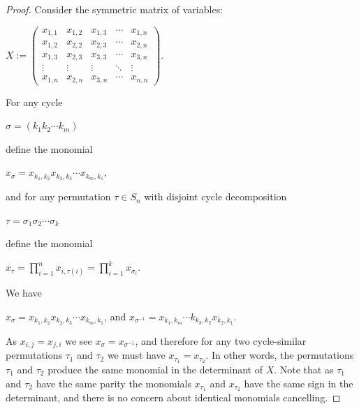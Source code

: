 \documentclass{article}
\begin{document}
\begin{proof}
  Consider the symmetric matrix of variables:
  \begin{center}
    $X := \left(\begin{array}{ccccc} x_{1,1} & x_{1,2} & x_{1,3} & \cdots & x_{1,n} \\ x_{1,2} & x_{2,2} & x_{2,3} & \cdots & x_{2,n} \\ x_{1,3} & x_{2,3} & x_{3,3} & \cdots & x_{3,n} \\ \vdots & \vdots & \vdots & \ddots & \vdots \\ x_{1,n} & x_{2,n} & x_{3,n} & \cdots & x_{n,n} \end{array}\right)$.
  \end{center} 
  For any cycle
  \begin{center}
    $\sigma = (k_{1}k_{2} \cdots k_{m})$
  \end{center}
  define the monomial
  \begin{center}
    $x_{\sigma} = x_{k_{1},k_{2}}x_{k_{2},k_{3}} \cdots x_{k_{m},k_{1}}$,
  \end{center}
  and for any permutation $\tau \in S_{n}$ with disjoint cycle decomposition 
  \begin{center}
    $\tau = \sigma_{1}\sigma_{2} \cdots \sigma_{k}$
  \end{center}
  define the monomial
  \begin{center}
    $x_{\tau} = \prod_{i= 1}^{n} x_{i,\tau(i)} = \prod_{i = 1}^{k}x_{\sigma_{i}}$.
  \end{center}
  We have
  \begin{center}
    $x_{\sigma} = x_{k_{1},k_{2}}x_{k_{2},k_{3}} \cdots x_{k_{m},k_{1}}$, \hspace{.1 in} and \hspace{.1 in} $x_{\sigma^{-1}} = x_{k_{1},k_{m}} \cdots k_{k_{3},k_{2}}x_{k_{2},k_{1}}$.
  \end{center}
  As $x_{i,j} = x_{j,i}$ we see $x_{\sigma} = x_{\sigma^{-1}}$, and therefore for any two cycle-similar permutations $\tau_{1}$ and $\tau_{2}$ we must have $x_{\tau_{1}} = x_{\tau_{2}}$. In other words, the permutations $\tau_{1}$ and $\tau_{2}$ produce the same monomial in the determinant of $X$. Note that as $\tau_{1}$ and $\tau_{2}$ have the same parity the monomials $x_{\tau_{1}}$ and $x_{\tau_{2}}$ have the same sign in the determinant, and there is no concern about identical monomials cancelling. 
  

\end{proof}
\end{document}
